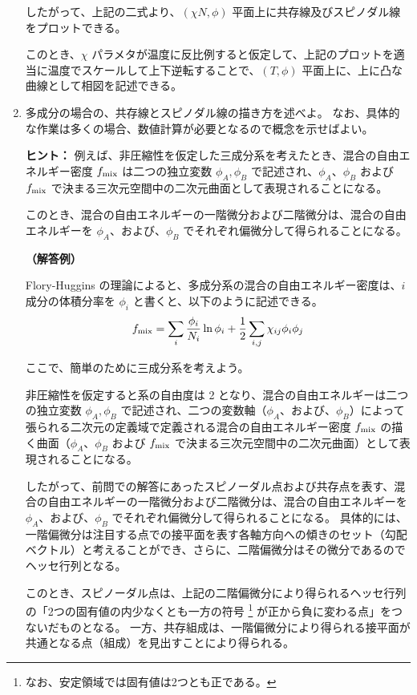 \documentclass[uplatex,dvipdfmx,a4paper,11pt]{jsarticle}
\begin{document}
\begin{enumerate}
したがって、上記の二式より、$(\chi N, \phi)$ 平面上に共存線及びスピノダル線をプロットできる。

このとき、$\chi$ パラメタが温度に反比例すると仮定して、上記のプロットを適当に温度でスケールして上下逆転することで、$(T, \phi)$ 平面上に、上に凸な曲線として相図を記述できる。

\newpage


\item
多成分の場合の、共存線とスピノダル線の描き方を述べよ。
なお、具体的な作業は多くの場合、数値計算が必要となるので概念を示せばよい。

\begin{itembox}[l]{{\bf ヒント：}}
例えば、非圧縮性を仮定した三成分系を考えたとき、混合の自由エネルギー密度 $f_{\rm{mix}}$ は二つの独立変数 $\phi_A, \phi_B$ で記述され、$\phi_A$、$\phi_B$ および $f_{\rm{mix}}$ で決まる三次元空間中の二次元曲面として表現されることになる。

このとき、混合の自由エネルギーの一階微分および二階微分は、混合の自由エネルギーを $\phi_A$、および、$\phi_B$ でそれぞれ偏微分して得られることになる。
\end{itembox}


{\bf （解答例）}

Flory-Huggins の理論によると、多成分系の混合の自由エネルギー密度は、$i$ 成分の体積分率を $\phi_i$ と書くと、以下のように記述できる。
\begin{equation*}
f_{\rm{mix}} = \sum_i \dfrac{\phi_i}{N_i} \ln \phi_i + \dfrac{1}{2} \sum_{i, j} \chi_{ij} \phi_i \phi_j
\end{equation*}

ここで、簡単のために三成分系を考えよう。

非圧縮性を仮定すると系の自由度は 2 となり、混合の自由エネルギーは二つの独立変数 $\phi_A, \phi_B$ で記述され、二つの変数軸（$\phi_A$、および、$\phi_B$）によって張られる二次元の定義域で定義される混合の自由エネルギー密度 $f_{\rm{mix}}$ の描く曲面（$\phi_A$、$\phi_B$ および $f_{\rm{mix}}$ で決まる三次元空間中の二次元曲面）として表現されることになる。

したがって、前問での解答にあったスピノーダル点および共存点を表す、混合の自由エネルギーの一階微分および二階微分は、混合の自由エネルギーを $\phi_A$、および、$\phi_B$ でそれぞれ偏微分して得られることになる。
具体的には、一階偏微分は注目する点での接平面を表す各軸方向への傾きのセット（勾配ベクトル）と考えることができ、さらに、二階偏微分はその微分であるのでヘッセ行列となる。

このとき、スピノーダル点は、上記の二階偏微分により得られるヘッセ行列の「2つの固有値の内少なくとも一方の符号
\footnote
{
なお、安定領域では固有値は2つとも正である。
}
が正から負に変わる点」をつないだものとなる。
一方、共存組成は、一階偏微分により得られる接平面が共通となる点（組成）を見出すことにより得られる。

\color{black}

\end{enumerate}
\end{document}
